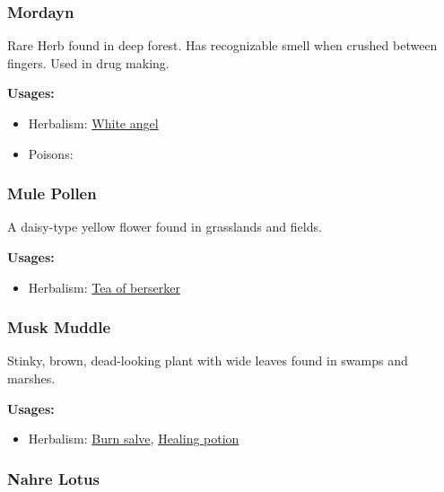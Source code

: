 \subsubsection{Mordayn}
\label{Mordayn}

Rare Herb found in deep forest. Has recognizable smell when crushed between fingers. Used in drug making.

\vspace{5mm}

\textbf{Usages:}

\begin{itemize}[noitemsep]
\item[] Herbalism: \hyperref[White angel]{White angel}
\item[] Poisons: \poison
\end{itemize}

\subsubsection{Mule Pollen}
\label{Mule Pollen}

A daisy-type yellow flower found in grasslands and fields.

\vspace{5mm}

\textbf{Usages:}

\begin{itemize}[noitemsep]
\item[] Herbalism: \hyperref[Tea of berserker]{Tea of berserker}
\end{itemize}

\subsubsection{Musk Muddle}
\label{Musk Muddle}

Stinky, brown, dead-looking plant with wide leaves found in swamps and marshes.

\vspace{5mm}

\textbf{Usages:}

\begin{itemize}[noitemsep]
\item[] Herbalism: \hyperref[Burn salve]{Burn salve}, \hyperref[healing_potion]{Healing potion}
\end{itemize}

\subsubsection{Nahre Lotus}
\label{Nahre Lotus}


